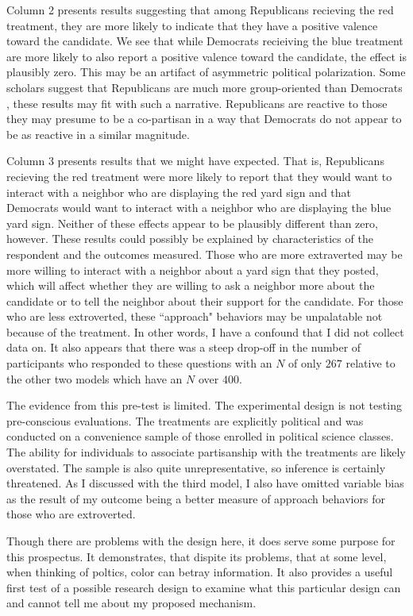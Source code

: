 \documentclass [12pt]{article}
\begin{document}
Column 2 presents results suggesting that among Republicans recieving the red treatment, they are more likely to indicate that they have a positive valence toward the candidate. We see that while Democrats recieiving the blue treatment are more likely to also report a positive valence toward the candidate, the effect is plausibly zero. This may be an artifact of asymmetric political polarization. Some scholars suggest that Republicans are much more group-oriented than Democrats \citep[see][]{lupton_et-al_2020}, these results may fit with such a narrative. Republicans are reactive to those they may presume to be a co-partisan in a way that Democrats do not appear to be as reactive in a similar magnitude.

Column 3 presents results that we might have expected. That is, Republicans recieving the red treatment were more likely to report that they would want to interact with a neighbor who are displaying the red yard sign and that Democrats would want to interact with a neighbor who are displaying the blue yard sign. Neither of these effects appear to be plausibly different than zero, however. These results could possibly be explained by characteristics of the respondent and the outcomes measured. Those who are more extraverted may be more willing to interact with a neighbor about a yard sign that they posted, which will affect whether they are willing to ask a neighbor more about the candidate or to tell the neighbor about their support for the candidate. For those who are less extroverted, these ``approach" behaviors may be unpalatable not because of the treatment. In other words, I have a confound that I did not collect data on. It also appears that there was a steep drop-off in the number of participants who responded to these questions with an $N$ of only $267$ relative to the other two models which have an $N$ over $400$. 

The evidence from this pre-test is limited. The experimental design is not testing pre-conscious evaluations. The treatments are explicitly political and was conducted on a convenience sample of those enrolled in political science classes. The ability for individuals to associate partisanship with the treatments are likely overstated. The sample is also quite unrepresentative, so inference is certainly threatened. As I discussed with the third model, I also have omitted variable bias as the result of my outcome being a better measure of approach behaviors for those who are extroverted. 

Though there are problems with the design here, it does serve some purpose for this prospectus. It demonstrates, that dispite its problems, that at some level, when thinking of poltics, color can betray information. It also provides a useful first test of a possible research design to examine what this particular design can and cannot tell me about my proposed mechanism. 
\end{document}
